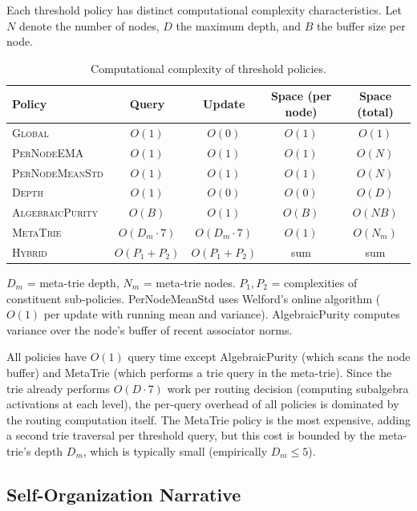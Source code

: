 \documentclass[11pt,a4paper]{article}
\theoremstyle{definition}
\theoremstyle{remark}
\begin{document}
Each threshold policy has distinct computational complexity characteristics. Let $N$ denote the number of nodes, $D$ the maximum depth, and $B$ the buffer size per node.

\begin{table}[ht]
\centering
\caption{Computational complexity of threshold policies.}
\label{tab:complexity}
\begin{tabular}{@{}lcccc@{}}
\toprule
Policy & Query & Update & Space (per node) & Space (total) \\
\midrule
\textsc{Global}          & $O(1)$ & $O(0)$ & $O(1)$ & $O(1)$ \\
\textsc{PerNodeEMA}      & $O(1)$ & $O(1)$ & $O(1)$ & $O(N)$ \\
\textsc{PerNodeMeanStd}  & $O(1)$ & $O(1)$ & $O(1)$ & $O(N)$ \\
\textsc{Depth}           & $O(1)$ & $O(0)$ & $O(0)$ & $O(D)$ \\
\textsc{AlgebraicPurity} & $O(B)$ & $O(1)$ & $O(B)$ & $O(NB)$ \\
\textsc{MetaTrie}        & $O(D_m \cdot 7)$ & $O(D_m \cdot 7)$ & $O(1)$ & $O(N_m)$ \\
\textsc{Hybrid}          & $O(P_1 + P_2)$ & $O(P_1 + P_2)$ & sum & sum \\
\bottomrule
\end{tabular}
\smallskip

\noindent\footnotesize $D_m$ = meta-trie depth, $N_m$ = meta-trie nodes. $P_1, P_2$ = complexities of constituent sub-policies. PerNodeMeanStd uses Welford's online algorithm ($O(1)$ per update with running mean and variance). AlgebraicPurity computes variance over the node's buffer of recent associator norms.
\end{table}

All policies have $O(1)$ query time except AlgebraicPurity (which scans the node buffer) and MetaTrie (which performs a trie query in the meta-trie). Since the trie already performs $O(D \cdot 7)$ work per routing decision (computing subalgebra activations at each level), the per-query overhead of all policies is dominated by the routing computation itself. The MetaTrie policy is the most expensive, adding a second trie traversal per threshold query, but this cost is bounded by the meta-trie's depth $D_m$, which is typically small (empirically $D_m \leq 5$).

\subsection{Self-Organization Narrative}
\label{sec:self-org}
\end{document}
